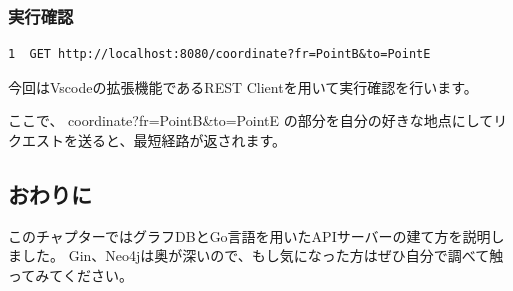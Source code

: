 \subsubsection{実行確認}

\begin{tcolorbox}[title=sample.http]
\begin{verbatim}
1  GET http://localhost:8080/coordinate?fr=PointB&to=PointE
\end{verbatim}
\end{tcolorbox}
今回はVscodeの拡張機能であるREST Clientを用いて実行確認を行います。

ここで、 coordinate?fr=PointB\&to=PointE の部分を自分の好きな地点にしてリクエストを送ると、最短経路が返されます。

\subsection{おわりに}
このチャプターではグラフDBとGo言語を用いたAPIサーバーの建て方を説明しました。
Gin、Neo4jは奥が深いので、もし気になった方はぜひ自分で調べて触ってみてください。
